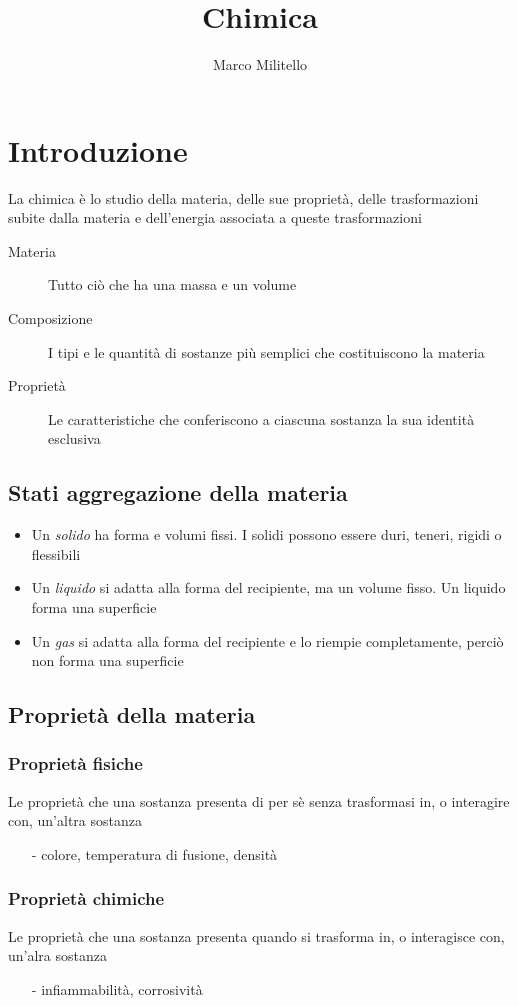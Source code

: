 \documentclass[a4paper,11pt]{report}
\begin{document}
	\date{}
	\author{Marco Militello}
	\title{Chimica}
	\maketitle
	\tableofcontents
	\newpage
	
\chapter{Introduzione}
La chimica è lo studio della materia, delle sue proprietà, delle trasformazioni subite dalla materia e dell'energia associata a queste trasformazioni
\begin{description}
	\item[Materia] Tutto ciò che ha una massa e un volume
	\item[Composizione] I tipi e le quantità di sostanze più semplici che costituiscono la materia
	\item[Proprietà] Le caratteristiche che conferiscono a ciascuna sostanza la sua identità esclusiva 
\end{description}
\section{Stati aggregazione della materia}
\begin{itemize}
	\item Un \emph{solido} ha forma e volumi fissi. I solidi possono essere duri, teneri, rigidi o flessibili
	\item Un \emph{liquido} si adatta alla forma del recipiente, ma un volume fisso. Un liquido forma una superficie
	\item Un \emph{gas} si adatta alla forma del recipiente e lo riempie completamente, perciò non forma una superficie
\end{itemize}
\section{Proprietà della materia}
\subsection*{Proprietà fisiche}
Le proprietà che una sostanza presenta di per sè senza trasformasi in, o interagire con, un'altra sostanza
\begin{itemize}
	\item[-] colore, temperatura di fusione, densità
\end{itemize}
\subsection*{Proprietà chimiche} 
Le proprietà che una sostanza presenta quando si trasforma in, o interagisce con, un'alra sostanza
\begin{itemize}
	\item[-] infiammabilità, corrosività
\end{itemize}
\end{document}
